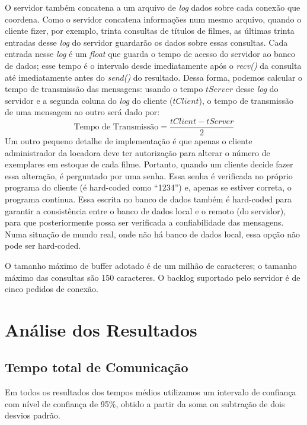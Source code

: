\documentclass[12pt,a4paper]{article}
\begin{document}
O servidor também concatena a um arquivo de {\it log} dados sobre cada conexão que coordena. Como o servidor concatena informações num mesmo arquivo, quando o cliente fizer, por exemplo, trinta consultas de títulos de filmes, as últimas trinta entradas desse {\it log} do servidor guardarão os dados sobre essas consultas. Cada entrada nesse {\it log} é um {\it float} que guarda o tempo de acesso do servidor ao banco de dados; esse tempo é o intervalo desde imediatamente após o {\it recv()} da consulta até imediatamente antes do {\it send()} do resultado. Dessa forma, podemos calcular o tempo de transmissão das mensagens: usando o tempo $ tServer $ desse {\it log} do servidor e a segunda coluna do {\it log} do cliente ($ tClient $), o tempo de transmissão de uma mensagem ao outro será dado por:
\begin{equation}
{\text {Tempo de Transmissão}} = \frac{tClient - tServer}{2}
\label{eqn:time}
\end{equation}
Um outro pequeno detalhe de implementação é que apenas o cliente administrador da locadora deve ter autorização para alterar o número de exemplares em estoque de cada filme. Portanto, quando um cliente decide fazer essa alteração, é perguntado por uma senha. Essa senha é verificada no próprio programa do cliente (é hard-coded como “1234”) e, apenas se estiver correta, o programa continua. Essa escrita no banco de dados também é hard-coded para garantir a consistência entre o banco de dados local e o remoto (do servidor), para que posteriormente possa ser verificada a confiabilidade das mensagens. Numa situação de mundo real, onde não há banco de dados local, essa opção não pode ser hard-coded.

O tamanho máximo de buffer adotado é de um milhão de caracteres; o tamanho máximo das consultas são 150 caracteres. O backlog suportado pelo servidor é de cinco pedidos de conexão.


\section{Análise dos Resultados}

\subsection{Tempo total de Comunicação}

Em todos os resultados dos tempos médios utilizamos um intervalo de confiança com nível de confiança de 95\%, obtido a partir da soma ou subtração de dois desvios padrão.
    
\end{document}
